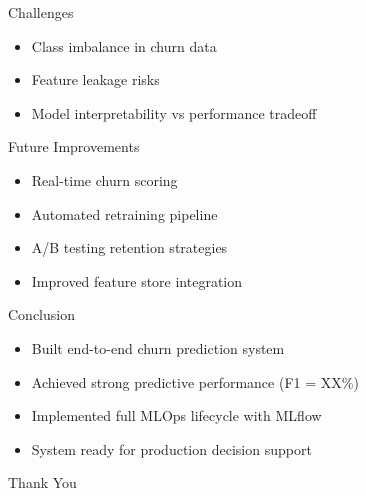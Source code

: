 \begin{frame}{Challenges}
\begin{itemize}
    \item Class imbalance in churn data
    \item Feature leakage risks
    \item Model interpretability vs performance tradeoff
\end{itemize}
\end{frame}

\begin{frame}{Future Improvements}
\begin{itemize}
    \item Real-time churn scoring
    \item Automated retraining pipeline
    \item A/B testing retention strategies
    \item Improved feature store integration
\end{itemize}
\end{frame}

\begin{frame}{Conclusion}
\begin{itemize}
    \item Built end-to-end churn prediction system
    \item Achieved strong predictive performance (F1 = XX\%)
    \item Implemented full MLOps lifecycle with MLflow
    \item System ready for production decision support
\end{itemize}
\end{frame}

\begin{frame}
\centering
\Huge Thank You
\end{frame}
